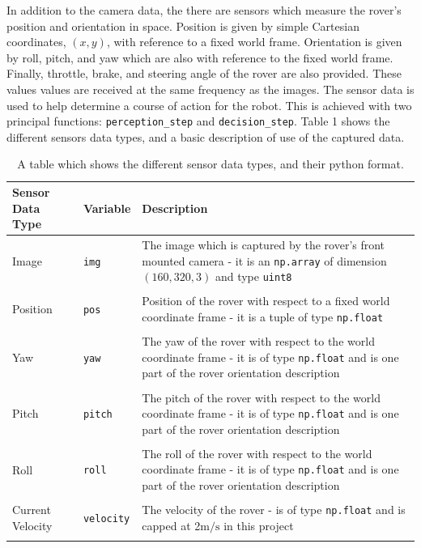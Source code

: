 \documentclass[a4paper]{article}
\begin{document}
In addition to the camera data, the there are sensors which measure the rover's position and orientation in space. Position is given by simple Cartesian coordinates, $(x, y)$, with reference to a fixed world frame. Orientation is given by roll, pitch, and yaw which are also with reference to the fixed world frame. Finally, throttle, brake, and steering angle of the rover are also provided. These values values are received at the same frequency as the images. The sensor data is used to help determine a course of action for the robot. This is achieved with two principal functions: \verb|perception_step| and \verb|decision_step|. Table 1 shows the different sensors data types, and a basic description of use of the captured data. 

\begin{table}[h]
\caption{A table which shows the different sensor data types, and their python format.}
\footnotesize
\begin{tabular}{llp{10cm}}
\toprule
\textbf{Sensor Data Type} & \textbf{Variable} & \textbf{Description}\\
\midrule
Image & \verb|img| & The image which is captured by the rover's front mounted camera - it is an \verb|np.array| of dimension $(160,320,3)$ and type \verb|uint8|\\
 & & \\
Position & \verb|pos| & Position of the rover with respect to a fixed world coordinate frame - it is a tuple of type \verb|np.float| \\
 & & \\
Yaw & \verb|yaw| & 	The yaw of the rover with respect to the world coordinate frame - it is of type \verb|np.float| and is one part of the rover orientation description\\
 & & \\
Pitch & \verb|pitch| & The pitch of the rover with respect to the world coordinate frame - it is of type \verb|np.float| and is one part of the rover orientation description\\
 & & \\
Roll & \verb|roll| & The roll of the rover with respect to the world coordinate frame - it is of type \verb|np.float| and is one part of the rover orientation description\\
 & & \\
Current Velocity & \verb|velocity| & The velocity of the rover - is of type \verb|np.float| and is capped at 2$\si{\meter\per\second}$ in this project\\
 & & \\

\end{tabular}
\end{table}
\end{document}
